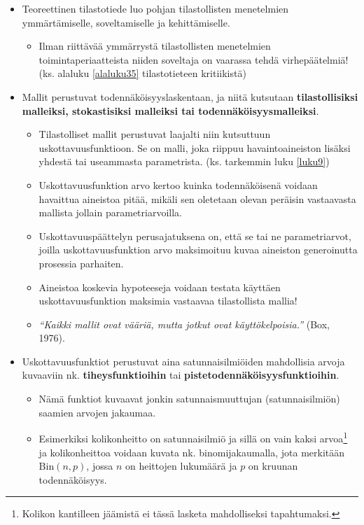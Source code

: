 \documentclass[
]{book}
\providecommand{\tightlist}{%
  \setlength{\itemsep}{0pt}\setlength{\parskip}{0pt}}
\begin{document}
\begin{itemize}
\tightlist
\item
  Teoreettinen tilastotiede luo pohjan tilastollisten menetelmien ymmärtämiselle, soveltamiselle ja kehittämiselle.

  \begin{itemize}
  \tightlist
  \item
    Ilman riittävää ymmärrystä tilastollisten menetelmien toimintaperiaatteista niiden soveltaja on vaarassa tehdä virhepäätelmiä! (ks. alaluku \ref{alaluku35} tilastotieteen kritiikistä)
  \end{itemize}
\item
  Mallit perustuvat todennäköisyyslaskentaan, ja niitä kutsutaan \textbf{tilastollisiksi malleiksi, stokastisiksi malleiksi tai todennäköisyysmalleiksi}.

  \begin{itemize}
  \tightlist
  \item
    Tilastolliset mallit perustuvat laajalti niin kutsuttuun uskottavuusfunktioon. Se on malli, joka riippuu havaintoaineiston lisäksi yhdestä tai useammasta parametrista. (ks. tarkemmin luku \ref{luku9})
  \item
    Uskottavuusfunktion arvo kertoo kuinka todennäköisenä voidaan havaittua aineistoa pitää, mikäli sen oletetaan olevan peräisin vastaavasta mallista jollain parametriarvoilla.
  \item
    Uskottavuuspäättelyn perusajatuksena on, että se tai ne parametriarvot, joilla uskottavuusfunktion arvo maksimoituu kuvaa aineiston generoinutta prosessia parhaiten.
  \item
    Aineistoa koskevia hypoteeseja voidaan testata käyttäen uskottavuusfunktion maksimia vastaavaa tilastollista mallia!
  \item
    \emph{``Kaikki mallit ovat vääriä, mutta jotkut ovat käyttökelpoisia.''} (Box, 1976).
  \end{itemize}
\end{itemize}

\hfill\break
\hfill\break

\begin{itemize}
\tightlist
\item
  Uskottavuusfunktiot perustuvat aina satunnaisilmiöiden mahdollisia arvoja kuvaaviin nk. \textbf{tiheysfunktioihin} tai \textbf{pistetodennäköisyysfunktioihin}.

  \begin{itemize}
  \tightlist
  \item
    Nämä funktiot kuvaavat jonkin satunnaismuuttujan (satunnaisilmiön) saamien arvojen jakaumaa.
  \item
    Esimerkiksi kolikonheitto on satunnaisilmiö ja sillä on vain kaksi arvoa\footnote{Kolikon kantilleen jäämistä ei tässä lasketa mahdolliseksi tapahtumaksi.} ja kolikonheittoa voidaan kuvata nk. binomijakaumalla, jota merkitään \(\text{Bin}(n,p)\), jossa \(n\) on heittojen lukumäärä ja \(p\) on kruunan todennäköisyys.
  \end{itemize}
\end{itemize}
\end{document}
